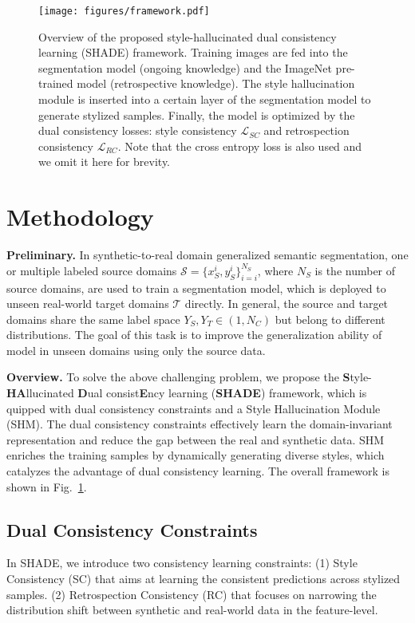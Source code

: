 \documentclass[runningheads]{llncs}
\newcommand{\ours}{SHADE\xspace}
\begin{document}
\begin{figure}[t]
    \centering
    \texttt{[image: figures/framework.pdf]}
\caption{Overview of the proposed style-hallucinated dual consistency learning (\ours) framework. Training images are fed into the segmentation model (ongoing knowledge) and the ImageNet pre-trained model (retrospective knowledge). 
    The style hallucination module is inserted into a certain layer of the segmentation model to generate stylized samples.
    Finally, the model is optimized by the dual consistency losses: style consistency $\mathcal{L}_{SC}$ and retrospection consistency $\mathcal{L}_{RC}$. Note that the cross entropy loss is also used and we omit it here for brevity.}
    \label{fig:framework}
\end{figure}

\section{Methodology}
\noindent\textbf{Preliminary.} In synthetic-to-real domain generalized semantic segmentation, one or multiple labeled source domains $\mathcal{S}=\{x_S^i, y_S^i\}_{i=i}^{N_S}$, where ${N_S}$ is the number of source domains, are used to train a segmentation model, which is deployed to unseen real-world target domains $\mathcal{T}$ directly. 
In general, the source and target domains share the same label space $Y_S, Y_T \in (1, N_C)$ but belong to different distributions. The goal of this task is to improve the generalization ability of model in unseen domains using only the source data.

\begin{sloppypar}
\noindent\textbf{Overview.} 
To solve the above challenging problem, we propose the \textbf{S}tyle-\textbf{HA}llucinated \textbf{D}ual consist\textbf{E}ncy learning (\textbf{\ours}) framework, which is quipped with dual consistency constraints and a Style Hallucination Module (SHM). The dual consistency constraints effectively learn the domain-invariant representation and reduce the gap between the real and synthetic data. SHM enriches the training samples by dynamically generating diverse styles, which catalyzes the advantage of dual consistency learning. The overall framework is shown in Fig.~\ref{fig:framework}.
\end{sloppypar}

\subsection{Dual Consistency Constraints}
In \ours, we introduce two consistency learning constraints: (1) Style Consistency (SC) that aims at learning the consistent predictions across stylized samples. (2) Retrospection Consistency (RC) that focuses on narrowing the distribution shift between synthetic and real-world data in the feature-level.
\end{document}

